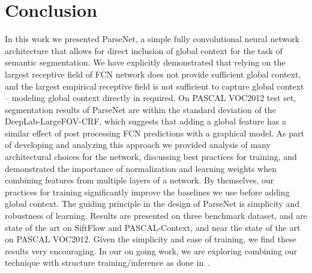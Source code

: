 \documentclass{article} \usepackage{iclr2016_conference}
\begin{document}
\section{Conclusion}
\label{sec:futurework}
In this work we presented ParseNet, a simple fully convolutional neural network architecture that allows for direct inclusion of global context for the task of semantic segmentation. We have explicitly demonstrated that relying on the largest receptive field of FCN network does not provide sufficient global context, and the largest empirical receptive field is not sufficient to capture global context -- modeling global context directly in required. On PASCAL VOC2012 test set, segmentation results of ParseNet are within the standard deviation of the DeepLab-LargeFOV-CRF, which suggests that adding a global feature has a similar effect of post processing FCN predictions with a graphical model. As part of developing and analyzing this approach we provided analysis of many architectural choices for the network, discussing best practices for training, and demonstrated the importance of normalization and learning weights when combining features from multiple layers of a network. By themselves, our practices for training significantly improve the baselines we use before adding global context. The guiding principle in the design of ParseNet is simplicity and robustness of learning. Results are presented on three benchmark dataset, and are state of the art on SiftFlow and PASCAL-Context, and near the state of the art on PASCAL VOC2012. Given the simplicity and ease of training, we find these results very encouraging. In our on going work, we are exploring combining our technique with structure training/inference as done in~\cite{schwing2015fully, lin2015efficient, zheng2015conditional}.


\end{document}
